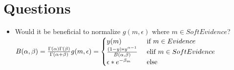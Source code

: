 \documentclass[11pt]{article}
\begin{document}
\section{Questions}
\begin{itemize}
    \item Would it be beneficial to normalize $g(m, \epsilon) \text{ where } m \in SoftEvidence$? \\
    $B(\alpha, \beta) = \frac{\Gamma(\alpha) \Gamma(\beta)}{\Gamma(\alpha + \beta)} \\
    g(m,\epsilon) = \begin{cases}
 y(m) & \text{ if } m \in Evidence \\ 
 \frac{(1 - y) * y ^ {\alpha - 1}}{B(\alpha, \beta)} &\text{ elif } m \in SoftEvidence\\
 \epsilon * e ^ {-\beta_m}& \text{ else}
\end{cases}$\\
\end{itemize}
\end{document}
